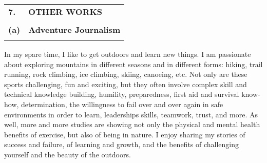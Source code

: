 \documentclass[11pt,notitlepage,english]{report}
\begin{document}
\begin{tabular}{L{.5cm} L{15.2cm} }
  \label{other_works}
  \\
  \textbf{7.}  & \textbf{OTHER WORKS}                                      \\
  \\
  \textbf{(a)} & \textbf{Adventure Journalism} \\
  \\
\end{tabular}

In my spare time, I like to get outdoors and learn new things. I am passionate
about exploring mountains in different seasons and in different forms: hiking,
trail running, rock climbing, ice climbing, skiing, canoeing, etc. Not only are
these sports challenging, fun and exciting, but they often involve complex
skill and technical knowledge building, humility, preparedness, first aid and
survival know-how, determination, the willingness to fail over and over again
in safe environments in order to learn, leaderships skills, teamwork, trust,
and more. As well, more and more studies are showing not only the physical and
mental health benefits of exercise, but also of being in nature. I enjoy
sharing my stories of success and failure, of learning and growth, and the
benefits of challenging yourself and the beauty of the outdoors.
\end{document}
